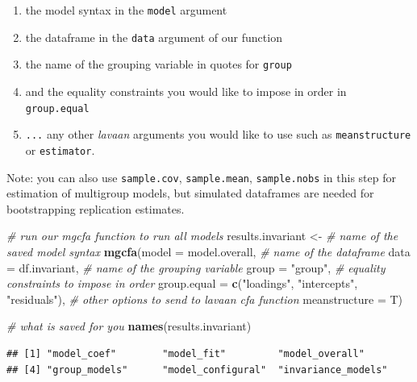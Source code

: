 \documentclass[
  man,floatsintext]{apa7}
\newenvironment{Shaded}{\begin{snugshade}}{\end{snugshade}}
\newcommand{\AttributeTok}[1]{\textcolor[rgb]{0.13,0.29,0.53}{#1}}
\newcommand{\CommentTok}[1]{\textcolor[rgb]{0.56,0.35,0.01}{\textit{#1}}}
\newcommand{\FunctionTok}[1]{\textcolor[rgb]{0.13,0.29,0.53}{\textbf{#1}}}
\newcommand{\NormalTok}[1]{#1}
\newcommand{\OtherTok}[1]{\textcolor[rgb]{0.56,0.35,0.01}{#1}}
\newcommand{\StringTok}[1]{\textcolor[rgb]{0.31,0.60,0.02}{#1}}
\providecommand{\tightlist}{%
  \setlength{\itemsep}{0pt}\setlength{\parskip}{0pt}}
\begin{document}
\begin{enumerate}
\def\labelenumi{\arabic{enumi})}
\tightlist
\item
  the model syntax in the \texttt{model} argument
\item
  the dataframe in the \texttt{data} argument of our function
\item
  the name of the grouping variable in quotes for \texttt{group}
\item
  and the equality constraints you would like to impose in order in \texttt{group.equal}
\item
  \texttt{...} any other \emph{lavaan} arguments you would like to use such as \texttt{meanstructure} or \texttt{estimator}.
\end{enumerate}

Note: you can also use \texttt{sample.cov}, \texttt{sample.mean}, \texttt{sample.nobs} in this step for estimation of multigroup models, but simulated dataframes are needed for bootstrapping replication estimates.

\small

\begin{Shaded}
\begin{Highlighting}[]
\CommentTok{\# run our mgcfa function to run all models}
\NormalTok{results.invariant }\OtherTok{\textless{}{-}} 
  \CommentTok{\# name of the saved model syntax}
  \FunctionTok{mgcfa}\NormalTok{(}\AttributeTok{model =}\NormalTok{ model.overall, }
        \CommentTok{\# name of the dataframe}
        \AttributeTok{data =}\NormalTok{ df.invariant,}
        \CommentTok{\# name of the grouping variable}
        \AttributeTok{group =} \StringTok{"group"}\NormalTok{,}
        \CommentTok{\# equality constraints to impose in order}
        \AttributeTok{group.equal =} \FunctionTok{c}\NormalTok{(}\StringTok{"loadings"}\NormalTok{, }\StringTok{"intercepts"}\NormalTok{, }\StringTok{"residuals"}\NormalTok{),}
        \CommentTok{\# other options to send to lavaan cfa function}
        \AttributeTok{meanstructure =}\NormalTok{ T)}

\CommentTok{\# what is saved for you}
\FunctionTok{names}\NormalTok{(results.invariant)}
\end{Highlighting}
\end{Shaded}

\normalsize

\begin{verbatim}
## [1] "model_coef"        "model_fit"         "model_overall"    
## [4] "group_models"      "model_configural"  "invariance_models"
\end{verbatim}
\end{document}

